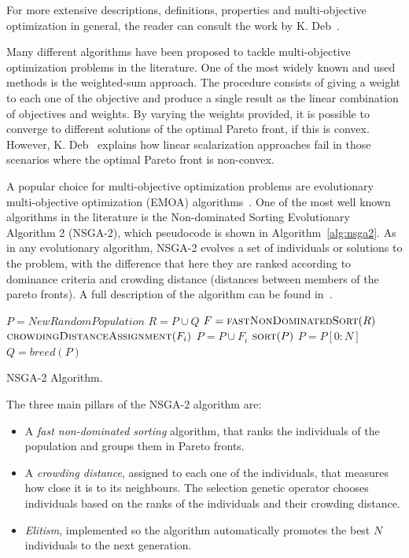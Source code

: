 \documentclass[journal]{IEEEtran}
\begin{document}
For more extensive descriptions, definitions, properties and multi-objective optimization in general, the reader can consult the work by K. Deb~\cite{Deb2001}.

Many different algorithms have been proposed to tackle multi-objective optimization problems in the literature. One of the most widely known and used methods is the weighted-sum approach. The procedure consists of giving a weight to each one of the objective and produce a single result as the linear combination of objectives and weights. By varying the weights provided, it is possible to converge to different solutions of the optimal Pareto front, if this is convex. However, K. Deb~\cite{Deb2001} explains how linear scalarization approaches fail in those scenarios where the optimal Pareto front is non-convex.

A popular choice for multi-objective optimization problems are evolutionary multi-objective optimization (EMOA) algorithms~\cite{Coello1999, Zhou2011}. One of the most well known algorithms in the literature is the Non-dominated Sorting Evolutionary Algorithm 2 (NSGA-2), which pseudocode is shown in Algorithm~\ref{alg:nsga2}. As in any evolutionary algorithm, NSGA-2 evolves a set of individuals or solutions to the problem, with the difference that here they are ranked according to dominance criteria and crowding distance (distances between members of the pareto fronts). A full description of the algorithm can be found in~\cite{Deb2000}.

\begin{algorithm}[!t]
\begin{algorithmic}[1]
	\State $P = NewRandomPopulation$
		\State $R = P \cup Q$ 
		\State $F = \Call{fastNonDominatedSort}{R}$
			\State $\Call{crowdingDistanceAssignment}{F_i}$	
			\State $P = P \cup F_i$
		\EndWhile
		\State $\Call{sort}{P}$
		\State $P = P[0:N]$
		\State $Q = breed(P)$	
	\EndWhile
\EndFunction
\end{algorithmic}
\caption{NSGA-2 Algorithm.}
\label{alg:nsga2}
\end{algorithm}

The three main pillars of the NSGA-2 algorithm are:

\begin{itemize}
\item A \textit{fast non-dominated sorting} algorithm, that ranks the individuals of the population and groups them in Pareto fronts.
\item A \textit{crowding distance}, assigned to each one of the individuals, that measures how close it is to its neighbours. The selection genetic operator chooses individuals based on the ranks of the individuals and their crowding distance.
\item \textit{Elitism}, implemented so the algorithm automatically promotes the best $N$ individuals to the next generation.
\end{itemize}
\end{document}
